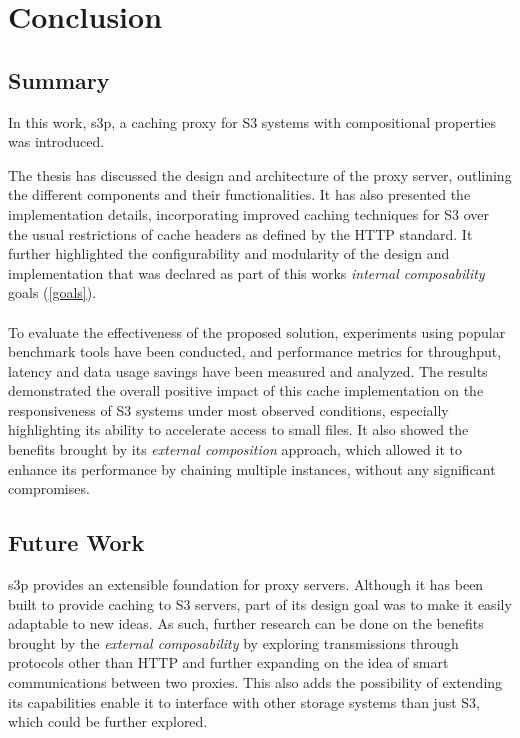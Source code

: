 \chapter{Conclusion}

\section{Summary}
In this work, s3p, a caching proxy for S3 systems with compositional properties was introduced. 

The thesis has discussed the design and architecture of the proxy server, outlining the different components and their functionalities. It has also presented the implementation details, incorporating improved caching techniques for S3 over the usual restrictions of cache headers as defined by the HTTP standard. It further highlighted the configurability and modularity of the design and implementation that was declared as part of this works \textit{internal composability} goals (\ref{goals}).
\\\\
To evaluate the effectiveness of the proposed solution, experiments using popular benchmark tools have been conducted, and performance metrics for throughput, latency and data usage savings have been measured and analyzed. 
The results demonstrated the overall positive impact of this cache implementation on the responsiveness of S3 systems under most observed conditions, especially highlighting its ability to accelerate access to small files. It also showed the benefits brought by its \textit{external composition} approach, which allowed it to enhance its performance by chaining multiple instances, without any significant compromises.


\section{Future Work}
s3p provides an extensible foundation for proxy servers. Although it has been built to provide caching to S3 servers, part of its design goal was to make it easily adaptable to new ideas.
As such, further research can be done on the benefits brought by the \textit{external composability} by exploring transmissions through protocols other than HTTP and further expanding on the idea of smart communications between two proxies.
This also adds the possibility of extending its capabilities enable it to interface with other storage systems than just S3, which could be further explored.